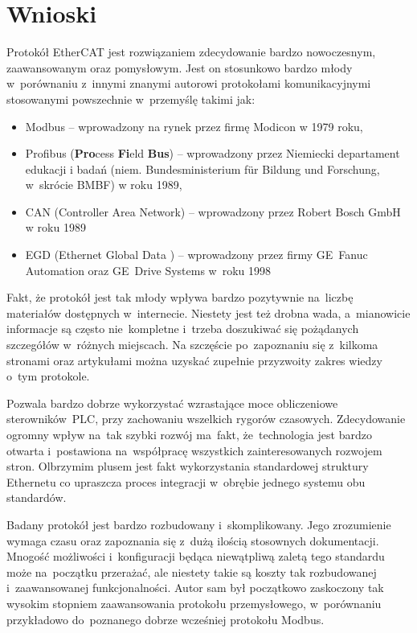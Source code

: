 \section{Wnioski}
Protokół EtherCAT jest rozwiązaniem zdecydowanie bardzo nowoczesnym, zaawansowanym oraz pomysłowym. 
Jest on stosunkowo bardzo młody w~porównaniu z~innymi znanymi autorowi protokołami komunikacyjnymi stosowanymi powszechnie w~przemyślę takimi jak:
\begin{itemize}
\item Modbus -- wprowadzony na rynek przez firmę Modicon w 1979 roku,
\item Profibus (\textbf{Pro}cess \textbf{Fi}eld \textbf{Bus}) -- wprowadzony przez Niemiecki departament edukacji i badań (niem. Bundesministerium für Bildung und Forschung, w~skrócie BMBF) w roku 1989,
\item CAN (Controller Area Network) -- wprowadzony przez Robert Bosch GmbH w roku 1989
\item EGD (Ethernet Global Data ) -- wprowadzony przez firmy GE~Fanuc Automation oraz GE~Drive Systems w~roku 1998
\end{itemize}

Fakt, że protokół jest tak młody wpływa bardzo pozytywnie na~liczbę materiałów dostępnych w~internecie. Niestety jest też drobna wada, a~mianowicie informacje są często nie~kompletne i~trzeba doszukiwać się pożądanych szczegółów w~różnych miejscach. Na szczęście po~zapoznaniu się z~kilkoma stronami oraz artykułami można uzyskać zupełnie przyzwoity zakres wiedzy o~tym protokole.

Pozwala bardzo dobrze wykorzystać wzrastające moce obliczeniowe sterowników~PLC, przy zachowaniu wszelkich rygorów czasowych. Zdecydowanie ogromny wpływ na~tak szybki rozwój ma~fakt, że~technologia jest bardzo otwarta i~postawiona na~współpracę wszystkich zainteresowanych rozwojem stron. Olbrzymim plusem jest fakt wykorzystania standardowej struktury Ethernetu co upraszcza proces integracji w~obrębie jednego systemu obu standardów.

Badany protokół jest bardzo rozbudowany i~skomplikowany. Jego zrozumienie wymaga czasu oraz zapoznania się z~dużą ilością stosownych dokumentacji. Mnogość możliwości i~konfiguracji będąca niewątpliwą zaletą tego standardu może na~początku przerażać, ale niestety takie są koszty tak rozbudowanej i~zaawansowanej funkcjonalności. Autor sam był początkowo zaskoczony tak wysokim stopniem zaawansowania protokołu przemysłowego, w~porównaniu przykładowo do~poznanego dobrze wcześniej protokołu Modbus.

